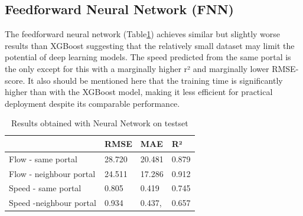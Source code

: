 	\subsection{Feedforward Neural Network (FNN)}
	The feedforward neural network (Table\ref{tab:result_NN}) achieves similar but slightly worse results than XGBoost suggesting that the relatively small dataset may limit the potential of deep learning models. The speed predicted from the same portal is the only except for this with a marginally higher r² and marginally lower RMSE-score. 
	It also should be mentioned here that the training time is significantly higher than with the XGBoost model, making it less efficient for practical deployment despite its comparable performance.
	\begin{table}[H]
		\centering
		\caption{Results obtained with Neural Network on testset}
		\label{tab:result_NN}
		\begin{tabular}{l|lll}
			& RMSE   & MAE    & R²    \\
			\hline
			Flow - same portal      &28.720& 20.481 & 0.879 \\
			Flow - neighbour portal &  24.511 & 17.286 &0.912 \\
			Speed - same portal     & 0.805 & 0.419& 0.745 \\
			Speed -neighbour portal & 0.934 & 0.437, & 0.657
		\end{tabular}
	\end{table}

